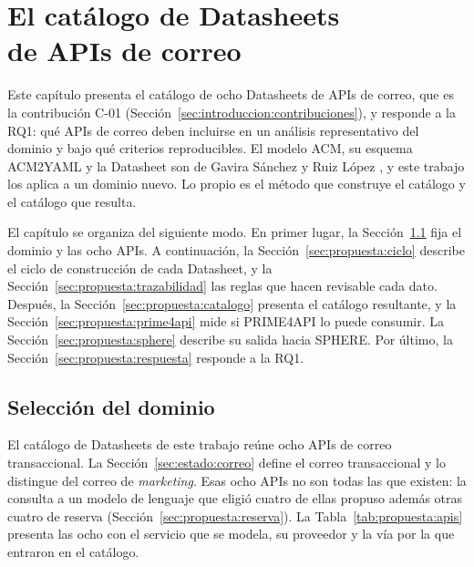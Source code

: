 \chapter[El catálogo de Datasheets de APIs de correo]{El catálogo de Datasheets\\ de APIs de correo}
\label{cap:catalogo}

Este capítulo presenta el catálogo de ocho Datasheets de APIs de correo, que es la contribución C-01 (Sección~\ref{sec:introduccion:contribuciones}), y responde a la RQ1: qué APIs de correo deben incluirse en un análisis representativo del dominio y bajo qué criterios reproducibles.
El modelo ACM, su esquema ACM2YAML y la Datasheet son de Gavira Sánchez y Ruiz López \citep{gavira2026tfm,ruizlopez2026tfm}, y este trabajo los aplica a un dominio nuevo.
Lo propio es el método que construye el catálogo y el catálogo que resulta.

El capítulo se organiza del siguiente modo.
En primer lugar, la Sección~\ref{sec:propuesta:seleccion} fija el dominio y las ocho APIs.
A continuación, la Sección~\ref{sec:propuesta:ciclo} describe el ciclo de construcción de cada Datasheet, y la Sección~\ref{sec:propuesta:trazabilidad} las reglas que hacen revisable cada dato.
Después, la Sección~\ref{sec:propuesta:catalogo} presenta el catálogo resultante, y la Sección~\ref{sec:propuesta:prime4api} mide si PRIME4API lo puede consumir.
La Sección~\ref{sec:propuesta:sphere} describe su salida hacia SPHERE.
Por último, la Sección~\ref{sec:propuesta:respuesta} responde a la RQ1.

\section{Selección del dominio}
\label{sec:propuesta:seleccion}

El catálogo de Datasheets de este trabajo reúne ocho APIs de correo transaccional.
La Sección~\ref{sec:estado:correo} define el correo transaccional y lo distingue del correo de \textit{marketing}.
Esas ocho APIs no son todas las que existen: la consulta a un modelo de lenguaje que eligió cuatro de ellas propuso además otras cuatro de reserva (Sección~\ref{sec:propuesta:reserva}).
La Tabla~\ref{tab:propuesta:apis} presenta las ocho con el servicio que se modela, su proveedor y la vía por la que entraron en el catálogo.

